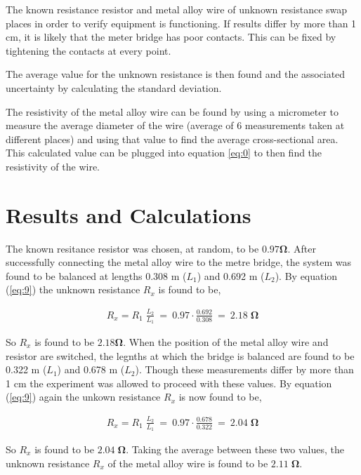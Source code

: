 \documentclass[12pt]{article}
\begin{document}
The known resistance resistor and metal alloy wire of unknown resistance swap places in order to verify equipment is functioning. If results differ by more than 1 cm, it is likely that the 
meter bridge has poor contacts. This can be fixed by tightening the contacts at every point.

The average value for the unknown resistance is then found and the associated uncertainty by calculating the standard deviation.

The resistivity of the metal alloy wire can be found by using a micrometer to measure the average diameter of the wire (average of 6 measurements taken at different places) and using that value
to find the average cross-sectional area. This calculated value can be plugged into equation \ref{eq:0} to then find the resistivity of the wire.

\section{Results and Calculations} \label{sec:3}

The known resitance resistor was chosen, at random, to be $\mathbf{0.97 \Omega}$. After successfully connecting the metal alloy wire to the metre bridge, the system was found to be balanced
at lengths 0.308 m ($L_1$) and 0.692 m ($L_2$). By equation (\ref{eq:9}) the unknown resistance $R_x$ is found to be,

\vspace{-2ex}
\begin{gather*}
    R_x = R_1 \; \frac{L_2}{L_1} \: = \: 0.97 \cdot \frac{0.692}{0.308} \: = \: \mathbf{2.18 \; \Omega}
\end{gather*}

So $R_x$ is found to be $\mathbf{2.18 \Omega}$. When the position of the metal alloy wire and resistor are switched, the legnths at which the bridge is balanced are found to be
0.322 m ($L_1$) and 0.678 m ($L_2$). Though these measurements differ by more than 1 cm the experiment was allowed to proceed with these values. By equation (\ref{eq:9}) again the unkown resistance $R_x$ is now found to be,

\vspace{-2ex}
\begin{gather*}
    R_x = R_1 \; \frac{L_2}{L_1} \: = \: 0.97 \cdot \frac{0.678}{0.322} \: = \: \mathbf{2.04 \; \Omega}
\end{gather*}

So $R_x$ is found to be $\mathbf{2.04 \; \Omega}$.
Taking the average between these two values, the unknown resistance $R_x$ of the metal alloy wire is found to be $\mathbf{2.11 \; \Omega}$.
\end{document}
